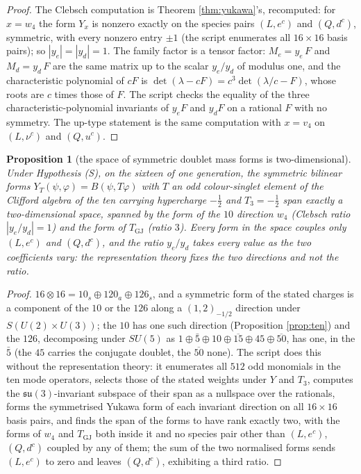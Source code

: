 \documentclass[11pt]{article}
\newtheorem{proposition}[theorem]{Proposition}
\theoremstyle{definition}
\newcommand{\su}{\mathfrak{su}}
\begin{document}
\begin{proof}
The Clebsch computation is Theorem \ref{thm:yukawa}'s, recomputed: for $x = w_{4}$ the form $Y_{x}$ is nonzero exactly on the species pairs $(L, e^{c})$ and $(Q, d^{c})$, symmetric, with every nonzero entry $\pm 1$ (the script enumerates all $16 \times 16$ basis pairs); so $|y_{e}| = |y_{d}| = 1$. The family factor is a tensor factor: $M_{e} = y_{e}\,F$ and $M_{d} = y_{d}\,F$ are the same matrix up to the scalar $y_{e}/y_{d}$ of modulus one, and the characteristic polynomial of $cF$ is $\det(\lambda - cF) = c^{3}\det(\lambda/c - F)$, whose roots are $c$ times those of $F$. The script checks the equality of the three characteristic-polynomial invariants of $y_{e}F$ and $y_{d}F$ on a rational $F$ with no symmetry. The up-type statement is the same computation with $x = v_{4}$ on $(L, \nu^{c})$ and $(Q, u^{c})$.
\end{proof}


\begin{proposition}[the space of symmetric doublet mass forms is two-dimensional]\label{prop:twodim}
Under Hypothesis (S), on the sixteen of one generation, the symmetric bilinear forms $Y_{T}(\psi, \varphi) = B(\psi, T\varphi)$ with $T$ an odd colour-singlet element of the Clifford algebra of the ten carrying hypercharge $-\tfrac12$ and $T_{3} = -\tfrac12$ span exactly a two-dimensional space, spanned by the form of the $10$ direction $w_{4}$ (Clebsch ratio $|y_{e}/y_{d}| = 1$) and the form of $T_{\mathrm{GJ}}$ (ratio $3$). Every form in the space couples only $(L, e^{c})$ and $(Q, d^{c})$, and the ratio $y_{e}/y_{d}$ takes every value as the two coefficients vary: the representation theory fixes the two directions and not the ratio.
\end{proposition}

\begin{proof}
$16 \otimes 16 = 10_{s} \oplus 120_{a} \oplus 126_{s}$, and a symmetric form of the stated charges is a component of the $10$ or the $126$ along a $(1, 2)_{-1/2}$ direction under $S(U(2) \times U(3))$; the $10$ has one such direction (Proposition \ref{prop:ten}) and the $126$, decomposing under $SU(5)$ as $1 \oplus \bar 5 \oplus 10 \oplus \overline{15} \oplus 45 \oplus \overline{50}$, has one, in the $\bar 5$ (the $45$ carries the conjugate doublet, the $\overline{50}$ none). The script does this without the representation theory: it enumerates all $512$ odd monomials in the ten mode operators, selects those of the stated weights under $Y$ and $T_{3}$, computes the $\su(3)$-invariant subspace of their span as a nullspace over the rationals, forms the symmetrised Yukawa form of each invariant direction on all $16 \times 16$ basis pairs, and finds the span of the forms to have rank exactly two, with the forms of $w_{4}$ and $T_{\mathrm{GJ}}$ both inside it and no species pair other than $(L, e^{c})$, $(Q, d^{c})$ coupled by any of them; the sum of the two normalised forms sends $(L, e^{c})$ to zero and leaves $(Q, d^{c})$, exhibiting a third ratio.
\end{proof}
\end{document}
